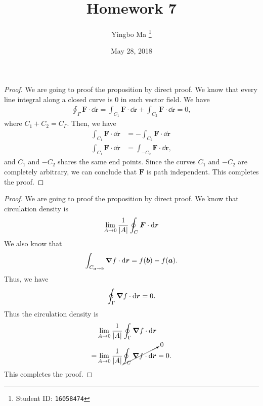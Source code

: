 \documentclass[8pt,twocolumn]{article}
\author{Yingbo Ma \thanks{Student ID: \tt{16058474}}}
\title{\vspace{-1.cm}Homework 7}
\date{May 28, 2018}
\begin{document}
\maketitle

\begin{Answer}[number=38]
  \begin{proof}
    We are going to proof the proposition by direct proof. We know that every
    line integral along a closed curve is $0$ in such vector field. We have
    \begin{align*}
      \oint_{\Gamma} \bm{F}\cdot \dd{\bm{r}} = \int_{C_1} \bm{F}\cdot \dd{\bm{r}} + \int_{C_2}
      \bm{F}\cdot \dd{\bm{r}} = 0,
    \end{align*}
    where $C_1 + C_2 = C_\Gamma$. Then, we have
    \begin{align*}
      \int_{C_1}\bm{F}\cdot \dd{\bm{r}} &= -\int_{C_2}\bm{F}\cdot \dd{\bm{r}} \\
      \int_{C_1}\bm{F}\cdot \dd{\bm{r}} &= \int_{-C_2}\bm{F}\cdot \dd{\bm{r}},
    \end{align*}
    and $C_1$ and $-C_2$ shares the same end points. Since the curves $C_1$ and
    $-C_2$ are completely arbitrary, we can conclude that $\bm{F}$ is path
    independent. This completes the proof.
  \end{proof}
\end{Answer}

\begin{Answer}[number=39]
  \begin{proof}
    We are going to proof the proposition by direct proof. We know that
    circulation density is
    \begin{align*}
      \lim_{A\to 0}{\frac{1}{\abs{A}}}\oint _{C}\bm{F} \cdot \dd{\bm{r}}
    \end{align*}
    We also know that
    \begin{align*}
      \int_{C_{\bm{a}\to \bm{b}}} \grad f \cdot\dd{\bm{r}} = f(\bm{b}) -
      f(\bm{a}).
    \end{align*}
    Thus, we have
    \begin{align*}
      \oint_{\Gamma} \grad f \cdot\dd{\bm{r}} = 0.
    \end{align*}
    Thus the circulation density is
    \begin{align*}
      &\lim_{A\to 0}{\frac{1}{\abs{A}}}\oint_{\Gamma}\grad f \cdot \dd{\bm{r}} \\
      =&\lim_{A\to 0}{\frac{1}{\abs{A}}}\cancelto{0}{\oint_{C}\grad f \cdot
      \dd{\bm{r}}} = 0.
    \end{align*}
    This completes the proof.
  \end{proof}
\end{Answer}
\end{document}
